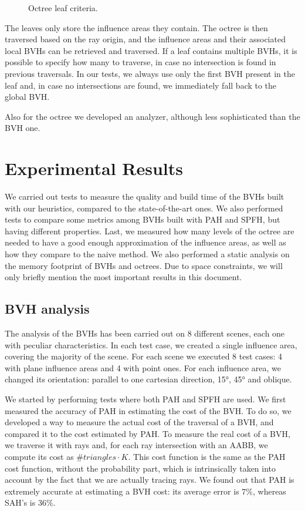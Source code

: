\documentclass[11pt,a4paper,twocolumn]{article}
\begin{document}
\begin{figure}[H]
{    }
    \caption{Octree leaf criteria.}
    \label{fig:leaves}
\end{figure}

The leaves only store the influence areas they contain. The octree is then traversed based on the ray origin, and the influence areas and their associated local BVHs can be retrieved and traversed. If a leaf contains multiple BVHs, it is possible to specify how many to traverse, in case no intersection is found in previous traversals. In our tests, we always use only the first BVH present in the leaf and, in case no intersections are found, we immediately fall back to the global BVH.

Also for the octree we developed an analyzer, although less sophisticated than the BVH one.

\section{Experimental Results}
We carried out tests to measure the quality and build time of the BVHs built with our heuristics, compared to the state-of-the-art ones. We also performed tests to compare some metrics among BVHs built with PAH and SPFH, but having different properties. Last, we measured how many levels of the octree are needed to have a good enough approximation of the influence areas, as well as how they compare to the naive method. We also performed a static analysis on the memory footprint of BVHs and octrees. Due to space constraints, we will only briefly mention the most important results in this document.

\subsection{BVH analysis}
The analysis of the BVHs has been carried out on 8 different scenes, each one with peculiar characteristics. In each test case, we created a single influence area, covering the majority of the scene. For each scene we executed 8 test cases: 4 with plane influence areas and 4 with point ones. For each influence area, we changed its orientation: parallel to one cartesian direction, 15°, 45° and oblique.

We started by performing tests where both PAH and SPFH are used. We first measured the accuracy of PAH in estimating the cost of the BVH. To do so, we developed a way to measure the actual cost of the traversal of a BVH, and compared it to the cost estimated by PAH. To measure the real cost of a BVH, we traverse it with rays and, for each ray intersection with an AABB, we compute its cost as $\#triangles \cdot K$. This cost function is the same as the PAH cost function, without the probability part, which is intrinsically taken into account by the fact that we are actually tracing rays. We found out that PAH is extremely accurate at estimating a BVH cost: its average error is $7\%$, whereas SAH's is $36\%$.
\end{document}
